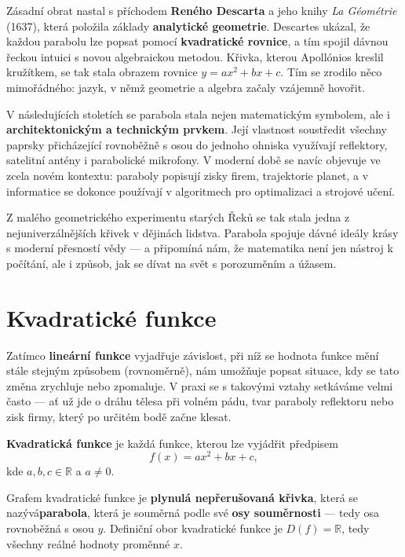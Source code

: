 \documentclass[12pt,a4paper]{article}
\begin{document}
\begin{historicalbox}
\smallskip
Zásadní obrat nastal s příchodem \textbf{Reného Descarta} a jeho knihy \textit{La Géométrie} (1637), která položila základy \textbf{analytické geometrie}.  
Descartes ukázal, že každou parabolu lze popsat pomocí \textbf{kvadratické rovnice}, a tím spojil dávnou řeckou intuici s novou algebraickou metodou.  
Křivka, kterou Apollónios kreslil kružítkem, se tak stala obrazem rovnice \(y = ax^2 + bx + c\).  
Tím se zrodilo něco mimořádného: jazyk, v němž geometrie a algebra začaly vzájemně hovořit.

\smallskip
V následujících stoletích se parabola stala nejen matematickým symbolem, ale i \textbf{architektonickým a technickým prvkem}.  
Její vlastnost soustředit všechny paprsky přicházející rovnoběžně s osou do jednoho ohniska využívají reflektory, satelitní antény i parabolické mikrofony.  
V moderní době se navíc objevuje ve zcela novém kontextu: paraboly popisují zisky firem, trajektorie planet, a v informatice se dokonce používají v algoritmech pro optimalizaci a strojové učení.

\smallskip
Z malého geometrického experimentu starých Řeků se tak stala jedna z nejuniverzálnějších křivek v dějinách lidstva.  
Parabola spojuje dávné ideály krásy s moderní přesností vědy — a připomíná nám, že matematika není jen nástroj k počítání, ale i způsob, jak se dívat na svět s porozuměním a úžasem.
\end{historicalbox}

\section{Kvadratické funkce}
Zatímco \textbf{lineární funkce} vyjadřuje závislost, při níž se hodnota funkce mění stále stejným způsobem 
(rovnoměrně),  nám umožňuje popsat situace, kdy se tato změna zrychluje nebo zpomaluje.  
V praxi se s takovými vztahy setkáváme velmi často — ať už jde o dráhu tělesa při volném pádu, 
tvar paraboly reflektoru nebo zisk firmy, který po určitém bodě začne klesat.

\begin{definitionbox}
\textbf{Kvadratická funkce} je každá funkce, kterou lze vyjádřit předpisem
\[
f(x) = ax^2 + bx + c,
\]
kde \(a, b, c \in \mathbb{R}\) a \(a \neq 0\).

\medskip
Grafem kvadratické funkce je \textbf{plynulá nepřerušovaná křivka}, která se nazývá\textbf{parabola}, 
která je souměrná podle své \textbf{osy souměrnosti} — tedy osa rovnoběžná s osou $y$.  
Definiční obor kvadratické funkce je \(D(f) = \mathbb{R}\), tedy všechny reálné hodnoty proměnné \(x\).
\end{definitionbox}
\end{document}
